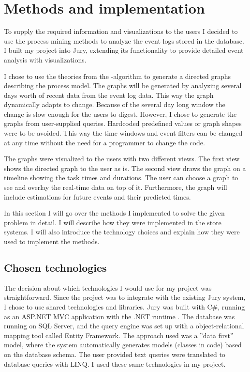 
\clearpage
\section{Methods and implementation}

To supply the required information and visualizations to the users I decided to use the process mining methods to analyze the event logs stored in the database.
I built my project into Jury, extending its functionality to provide detailed event analysis with visualizations.

I chose to use the theories from the \textalpha-algorithm to generate a directed graphs describing the process model.
The graphs will be generated by analyzing several days worth of recent data from the event log data. This way the graph dynamically adapts to change. Because of the several day long window the change is slow enough for the users to digest. 
However, I chose to generate the graphs from user-supplied queries.
Hardcoded predefined values or graph shapes were to be avoided.
This way the time windows and event filters can be changed at any time without the need for a programmer to change the code.

The graphs were visualized to the users with two different views. The first view shows the directed graph to the user as is. The second view draws the graph on a timeline showing the task times and durations.
The user can choose a graph to see and overlay the real-time data on top of it.
Furthermore, the graph will include estimations for future events and their predicted times.

In this section I will go over the methods I implemented to solve the given problem in detail.
I will describe how they were implemented in the store systems.
I will also introduce the technology choices and explain how they were used to implement the methods.

\subsection{Chosen technologies}

The decision about which technologies I would use for my project was straightforward.
Since the project was to integrate with the existing Jury system, I chose to use shared technologies and libraries.
Jury was built with C\#, running as an ASP.NET MVC application with the .NET runtime .
The database was running on SQL Server, and the query engine was set up with a object-relational mapping tool called Entity Framework. The approach used was a ''data first'' model, where the system automatically generates models (classes in code) based on the database schema. 
The user provided text queries were translated to database queries with LINQ. 
I used these same technologies in my project.

